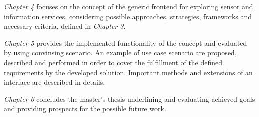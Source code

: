 \emph{Chapter 4} focuses on the concept of the generic frontend for exploring sensor and information services, considering possible approaches, strategies, frameworks and necessary criteria, defined in \emph{Chapter 3}.

\emph{Chapter 5} provides the implemented functionality of the concept and evaluated by using convinsing scenario. An example of use case scenario are proposed, described and performed in order to cover the fulfillment of the defined requirements by the developed solution. Important methods and extensions of an interface are described in details.

\emph{Chapter 6} concludes the master's thesis underlining and evaluating achieved goals and providing prospects for the possible future work.  

